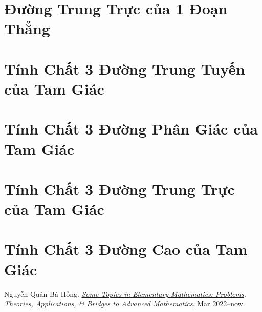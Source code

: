 \documentclass[oneside]{book}
\numberwithin{equation}{section}
\begin{document}
\section{Đường Trung Trực của 1 Đoạn Thẳng}

\section{Tính Chất 3 Đường Trung Tuyến của Tam Giác}

\section{Tính Chất 3 Đường Phân Giác của Tam Giác}

\section{Tính Chất 3 Đường Trung Trực của Tam Giác}

\section{Tính Chất 3 Đường Cao của Tam Giác}


\begin{thebibliography}{99}
	 Nguyễn Quản Bá Hồng. \href{https://github.com/NQBH/hobby/blob/master/elementary_mathematics/some_topics_in_elementary_mathematics_problems_theories_applications_bridges_to_advanced_mathematics/NQBH_some_topics_in_elementary_mathematics_problems_theories_applications_bridges_to_advanced_mathematics.pdf}{\textit{Some Topics in Elementary Mathematics: Problems, Theories, Applications, \& Bridges to Advanced Mathematics}}. Mar 2022--now.
\end{thebibliography}


\printbibliography[heading=bibintoc]
	
\end{document}
